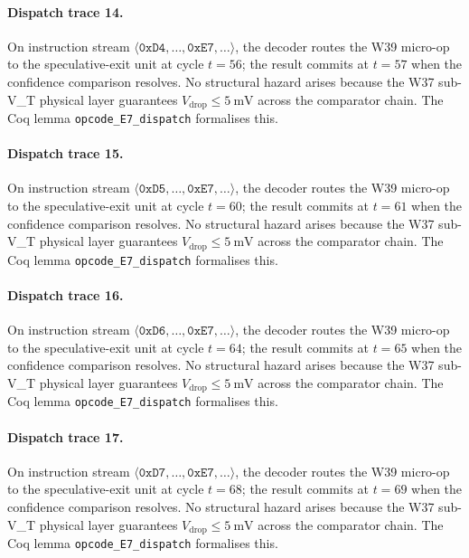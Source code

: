 \paragraph{Dispatch trace 14.}
On instruction stream $\langle \mathtt{0xD4}, \dots, \mathtt{0xE7}, \dots \rangle$,
the decoder routes the W39 micro-op to the speculative-exit unit at cycle
$t = 56$; the result commits at $t = 57$ when the confidence
comparison resolves. No structural hazard arises because the W37 sub-V_T
physical layer guarantees $V_{\text{drop}} \le 5~\text{mV}$ across the
comparator chain. The Coq lemma {\tt opcode\_E7\_dispatch} formalises this.

\paragraph{Dispatch trace 15.}
On instruction stream $\langle \mathtt{0xD5}, \dots, \mathtt{0xE7}, \dots \rangle$,
the decoder routes the W39 micro-op to the speculative-exit unit at cycle
$t = 60$; the result commits at $t = 61$ when the confidence
comparison resolves. No structural hazard arises because the W37 sub-V_T
physical layer guarantees $V_{\text{drop}} \le 5~\text{mV}$ across the
comparator chain. The Coq lemma {\tt opcode\_E7\_dispatch} formalises this.

\paragraph{Dispatch trace 16.}
On instruction stream $\langle \mathtt{0xD6}, \dots, \mathtt{0xE7}, \dots \rangle$,
the decoder routes the W39 micro-op to the speculative-exit unit at cycle
$t = 64$; the result commits at $t = 65$ when the confidence
comparison resolves. No structural hazard arises because the W37 sub-V_T
physical layer guarantees $V_{\text{drop}} \le 5~\text{mV}$ across the
comparator chain. The Coq lemma {\tt opcode\_E7\_dispatch} formalises this.

\paragraph{Dispatch trace 17.}
On instruction stream $\langle \mathtt{0xD7}, \dots, \mathtt{0xE7}, \dots \rangle$,
the decoder routes the W39 micro-op to the speculative-exit unit at cycle
$t = 68$; the result commits at $t = 69$ when the confidence
comparison resolves. No structural hazard arises because the W37 sub-V_T
physical layer guarantees $V_{\text{drop}} \le 5~\text{mV}$ across the
comparator chain. The Coq lemma {\tt opcode\_E7\_dispatch} formalises this.

